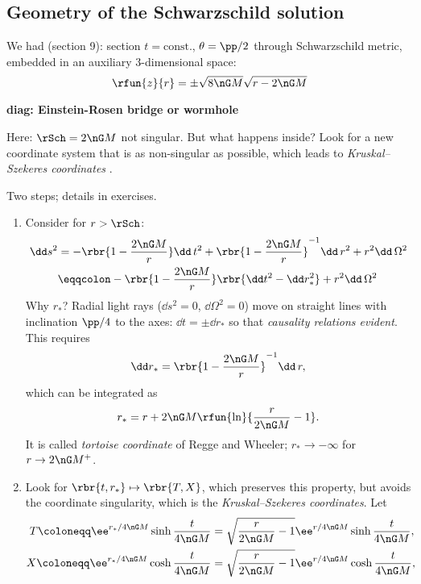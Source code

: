 \subsection{Geometry of the Schwarzschild solution}

We had (section 9): section $t = \text{const.}$, $\theta = \pp/2$ through
Schwarzschild metric, embedded in an auxiliary $3$-dimensional space:
\begin{equation}
\rfun{z}{r} = \pm \sqrt{8\nG M}\sqrt{r-2\nG M}
\end{equation}

\textbf{diag: Einstein-Rosen bridge or wormhole}

Here: $\rSch = 2\nG M$ not singular. But what happens inside? Look for a new
coordinate system that is as non-singular as possible, which leads to
\emph{Kruskal--Szekeres coordinates} 
\cite{Szekeres2002,PhysRev.119.1743}.

Two steps; details in exercises.
\begin{enumerate}
\item
Consider for $r > \rSch$:
\begin{align}
\dd s^2 &= -\rbr{1-\frac{2\nG M}{r}}\dd\, t^2 + \rbr{1-\frac{2\nG M}{r}}^{-1}
\dd\, r^2 + r^2 \dd\, \Omega^2 \nonumber \\
&\eqqcolon -\rbr{1-\frac{2\nG M}{r}}\rbr{\dd t^2 - \dd r_*^2}
+ r^2 \dd\, \Omega^2
\end{align}
Why $r_*$? Radial light rays ($\dd s^2 = 0$, $\dd \Omega^2 = 0$) move on
straight lines with inclination $\pp / 4$ to the axes: $\dd t = \pm \dd r_*$
so that \emph{causality relations evident}. This requires
\begin{equation}
\dd r_* = \rbr{1-\frac{2\nG M}{r}}^{-1}\dd\, r,
\end{equation}
which can be integrated as
\begin{equation}
r_* = r + 2\nG M \rfun{\ln}{\frac{r}{2\nG M} -1}.
\label{eq:tortoise-r}
\end{equation}
It is called \emph{tortoise coordinate} of Regge and Wheeler; $r_* \to
-\infty$ for $r \to 2\nG M^+$.



\item
Look for $\rbr{t, r_*} \mapsto \rbr{T, X}$, which preserves this property, but
avoids the coordinate singularity, which is the \emph{Kruskal--Szekeres
coordinates}. Let
\begin{align}
T \coloneqq \ee^{r_*/4\nG M}\sinh\frac{t}{4\nG M}
&= \sqrt{\frac{r}{2\nG M}-1}\ee^{r/4\nG M}\sinh\frac{t}{4\nG M},
\label{eq:KScoord-T}\\
X \coloneqq \ee^{r_*/4\nG M}\cosh\frac{t}{4\nG M}
&= \sqrt{\frac{r}{2\nG M}-1}\ee^{r/4\nG M}\cosh\frac{t}{4\nG M},
\label{eq:KScoord-X}
\end{align}
\end{enumerate}

